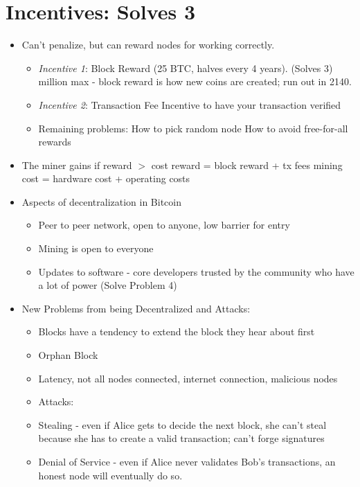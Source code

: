 \documentclass{article}
\begin{document}
\section*{Incentives: Solves 3}
\begin{itemize}
  \item Can't penalize, but can reward nodes for working correctly.
    \begin{itemize}
      \item \emph{Incentive 1}: Block Reward (25 BTC, halves every 4 years). (Solves 3)
         million max - block reward is how new coins are created; run out in 2140.
      \item \emph{Incentive 2}: Transaction Fee
        \subitem Incentive to have your transaction verified
      \item Remaining problems: 
        \subitem How to pick random node
        \subitem How to avoid free-for-all rewards
    \end{itemize}
  \item The miner gains if reward $>$ cost
    \subitem reward = block reward + tx fees
    \subitem mining cost = hardware cost + operating costs
  \item Aspects of decentralization in Bitcoin
    \begin{itemize}
      \item Peer to peer network, open to anyone, low barrier for entry
      \item Mining is open to everyone
      \item Updates to software - core developers trusted by the community who have a lot of power (Solve Problem 4)
    \end{itemize}
  \item New Problems from being Decentralized and Attacks:
    \begin{itemize}
      \item Blocks have a tendency to extend the block they hear about first
      \item Orphan Block
      \item Latency, not all nodes connected, internet connection, malicious nodes
      \item Attacks:
      \item Stealing - even if Alice gets to decide the next block, she can't steal because she has to create
        a valid transaction; can't forge signatures
      \item Denial of Service - even if Alice never validates Bob's transactions, an honest node will eventually do so.

\end{itemize}
\end{itemize}
\end{document}
